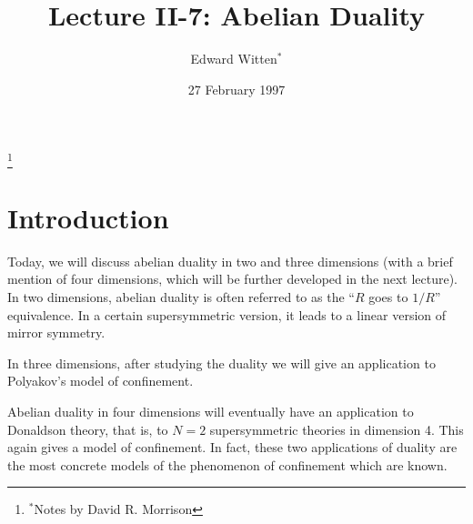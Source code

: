 \newcommand{\cb}{{\Scr S}}

\newcommand{\ee}{\text{e}}
\newcommand{\gee}{\text{g}}

\newcommand{\cA}{{\cal A}}

\newcommand{\cD}{{\cal D}}

\newcommand{\cH}{{\cal H}}

\newcommand{\cO}{{\cal O}}

\newcommand{\IR}{{\Bbb R}}
\newcommand{\IZ}{{\Bbb Z}}

\newcommand{\Hol}{\operatorname{\rm Hol}}
\newcommand{\Maps}{\operatorname{\rm Maps}}
\renewcommand{\Re}{\operatorname{\rm Re}}
\newcommand{\Tr}{\operatorname{\rm Tr}}
\newcommand{\vol}{\operatorname{\rm vol}}




\title[]{Lecture II-7: Abelian Duality}
\author[]{Edward Witten$^*$}
\thanks{$^*$Notes by David R. Morrison}
\date{27 February 1997}
\maketitle

\section{Introduction}

Today, we will discuss abelian duality in two and three dimensions (with a
brief mention of four dimensions, which will be further developed in the next
lecture).
In two dimensions, abelian duality is
often referred to as the ``$R$ goes to $1/R$'' equivalence.  In a certain
supersymmetric version, it leads to a linear version of mirror symmetry.

In three dimensions, after studying the duality we will give an application
to Polyakov's model of confinement.

Abelian duality in four dimensions will eventually have an application to
Donaldson theory, that is, to $N=2$ supersymmetric theories in dimension 4.
This again gives a model of confinement.  In fact, these two applications
of duality are the most concrete models of the phenomenon of confinement
which are known.

